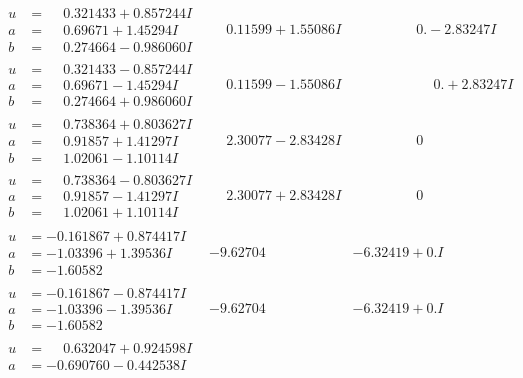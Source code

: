 \documentclass[1p]{elsarticle_modified}
\theoremstyle{definition}
\begin{document}
$$\begin{array}{c|c|c}
\begin{aligned}
u &= \phantom{-}0.321433 + 0.857244 I \\
a &= \phantom{-}0.69671 + 1.45294 I \\
b &= \phantom{-}0.274664 - 0.986060 I\end{aligned}
 & \phantom{-}0.11599 + 1.55086 I & \phantom{-0.000000 } 0. - 2.83247 I \\ \hline\begin{aligned}
u &= \phantom{-}0.321433 - 0.857244 I \\
a &= \phantom{-}0.69671 - 1.45294 I \\
b &= \phantom{-}0.274664 + 0.986060 I\end{aligned}
 & \phantom{-}0.11599 - 1.55086 I & \phantom{-0.000000 -}0. + 2.83247 I \\ \hline\begin{aligned}
u &= \phantom{-}0.738364 + 0.803627 I \\
a &= \phantom{-}0.91857 + 1.41297 I \\
b &= \phantom{-}1.02061 - 1.10114 I\end{aligned}
 & \phantom{-}2.30077 - 2.83428 I & \phantom{-0.000000 } 0 \\ \hline\begin{aligned}
u &= \phantom{-}0.738364 - 0.803627 I \\
a &= \phantom{-}0.91857 - 1.41297 I \\
b &= \phantom{-}1.02061 + 1.10114 I\end{aligned}
 & \phantom{-}2.30077 + 2.83428 I & \phantom{-0.000000 } 0 \\ \hline\begin{aligned}
u &= -0.161867 + 0.874417 I \\
a &= -1.03396 + 1.39536 I \\
b &= -1.60582\phantom{ +0.000000I}\end{aligned}
 & -9.62704\phantom{ +0.000000I} & -6.32419 + 0. I\phantom{ +0.000000I} \\ \hline\begin{aligned}
u &= -0.161867 - 0.874417 I \\
a &= -1.03396 - 1.39536 I \\
b &= -1.60582\phantom{ +0.000000I}\end{aligned}
 & -9.62704\phantom{ +0.000000I} & -6.32419 + 0. I\phantom{ +0.000000I} \\ \hline\begin{aligned}
u &= \phantom{-}0.632047 + 0.924598 I \\
a &= -0.690760 - 0.442538 I \\

\end{aligned}
\end{array}$$
\end{document}
